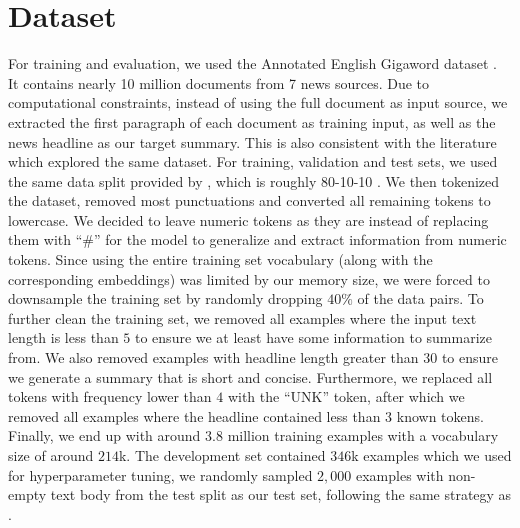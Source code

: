 \section{Dataset}
\label{sec: dataset}

For training and evaluation, we used the Annotated English Gigaword dataset \cite{graff2003english}. It contains nearly 10 million documents from 7 news sources. Due to computational constraints, instead of using the full document as input source, we extracted the first paragraph of each document as training input, as well as the news headline as our target summary. This is also consistent with the literature which explored the same dataset. For training, validation and test sets, we used the same data split provided by \cite{rush2015neural}, which is roughly 80-10-10 . We then tokenized the dataset, removed most punctuations and converted all remaining tokens to lowercase. We decided to leave numeric tokens as they are instead of replacing them with ``$\#$'' for the model to generalize and extract information from numeric tokens. Since using the entire training set vocabulary (along with the corresponding embeddings) was limited by our memory size, we were forced to downsample the training set by randomly dropping $40\%$ of the data pairs. To further clean the training set, we removed all examples where the input text length is less than $5$ to ensure we at least have some information to summarize from. We also removed examples with headline length greater than $30$ to ensure we generate a summary that is short and concise. Furthermore, we replaced all tokens with frequency lower than $4$ with the ``UNK'' token, after which we removed all examples where the headline contained less than $3$ known tokens. Finally, we end up with around $3.8$ million training examples with a vocabulary size of around $214$k.  The development set contained $346$k examples which we used for hyperparameter tuning, we randomly sampled $2,000$ examples with non-empty text body from the test split as our test set, following the same strategy as \cite{rush2015neural}.
